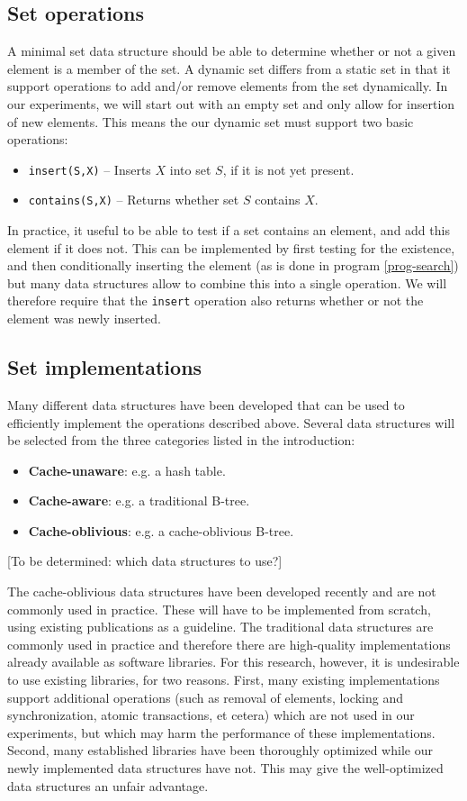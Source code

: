 \documentclass{acm_proc_article-sp}
\begin{document}
\subsection{Set operations}
A minimal set data structure should be able to determine whether or not a given element is a member of the set. A dynamic set differs from a static set in that it support operations to add and/or remove elements from the set dynamically. In our experiments, we will start out with an empty set and only allow for insertion of new elements. This means the our dynamic set must support two basic operations:
\begin{itemize}
\item \verb#insert(S,X)# -- Inserts $X$ into set $S$, if it is not yet present.
\item \verb#contains(S,X)# -- Returns whether set $S$ contains $X$.
\end{itemize}
In practice, it useful to be able to test if a set contains an element, and add this element if it does not. This can be implemented by first testing for the existence, and then conditionally inserting the element (as is done in program \ref{prog-search}) but many data structures allow to combine this into a single operation. We will therefore require that the \verb#insert# operation also returns whether or not the element was newly inserted.

\subsection{Set implementations}
Many different data structures have been developed that can be used to efficiently implement the operations described above. Several data structures will be selected from the three categories listed in the introduction:
\begin{itemize}
\item \textbf{Cache-unaware}: e.g. a hash table.
\item \textbf{Cache-aware}: e.g. a traditional B-tree.
\item \textbf{Cache-oblivious}: e.g. a cache-oblivious B-tree.
\end{itemize}
[To be determined: which data structures to use?]

The cache-oblivious data structures have been developed recently and are not commonly used in practice. These will have to be implemented from scratch, using existing publications as a guideline. The traditional data structures are commonly used in practice and therefore there are high-quality implementations already available as software libraries. For this research, however, it is undesirable to use existing libraries, for two reasons. First, many existing implementations support additional operations (such as removal of elements, locking and synchronization, atomic transactions, et cetera) which are not used in our experiments, but which may harm the performance of these implementations. Second, many established libraries have been thoroughly optimized while our newly implemented data structures have not. This may give the well-optimized data structures an unfair advantage.
\end{document}
